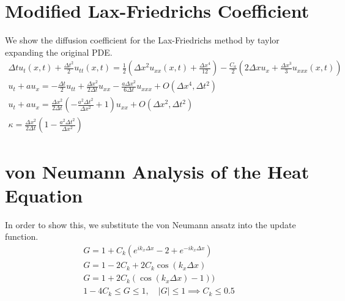 \documentclass{article}
\begin{document}
\section{Modified Lax-Friedrichs Coefficient}

We show the diffusion coefficient for the Lax-Friedrichs method by taylor
expanding the original PDE. 
\begin{gather*}
    \Delta t u_t(x,t) + \frac{\Delta t^2}{2} u_{tt}(x,t)  =
    \frac{1}{2}\left(\Delta x^2u_{xx}(x,t) + \frac{\Delta x^4}{12} \right) -
    \frac{C_a}{2}\left(2\Delta x u_x + \frac{\Delta x^3}{3}u_{xxx}(x,t) \right)\\
    u_t + a u_x = - \frac{\Delta t}{2} u_{tt} + \frac{\Delta x^2}{2\Delta
    t}u_{xx} - \frac{a\Delta x^2}{6\Delta t}u_{xxx} + O(\Delta x^4, \Delta
    t^2)\\
    u_t + a u_x = \frac{\Delta x^2}{2\Delta t}\left(-\frac{a^2\Delta t^2}{\Delta
    x^2} + 1\right)u_{xx} + O(\Delta x^2, \Delta t^2)\\
    \kappa = \frac{\Delta x^2}{2\Delta t}\left(1-\frac{a^2\Delta t^2}{\Delta
    x^2}\right)
\end{gather*}

\section{von Neumann Analysis of the Heat Equation}

In order to show this, we substitute the von Neumann ansatz into the update
function.  
\begin{gather*}
    G = 1 + C_k\left(e^{ik_x\Delta x} - 2 + e^{-ik_x\Delta x}\right)\\
    G = 1 - 2C_k + 2C_k\cos(k_x\Delta x) \\
    G = 1 + 2C_k(\cos(k_x\Delta x) -1))\\
    1 - 4C_k \le G \le 1,\quad |G| \le 1  \implies C_k \le 0.5
\end{gather*}
\end{document}
